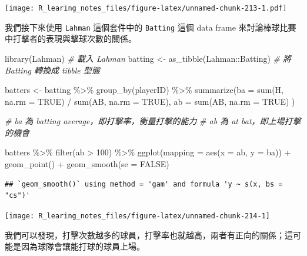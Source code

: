 \documentclass[
]{book}
\newenvironment{Shaded}{\begin{snugshade}}{\end{snugshade}}
\newcommand{\AttributeTok}[1]{\textcolor[rgb]{0.77,0.63,0.00}{#1}}
\newcommand{\CommentTok}[1]{\textcolor[rgb]{0.56,0.35,0.01}{\textit{#1}}}
\newcommand{\ConstantTok}[1]{\textcolor[rgb]{0.00,0.00,0.00}{#1}}
\newcommand{\DecValTok}[1]{\textcolor[rgb]{0.00,0.00,0.81}{#1}}
\newcommand{\FunctionTok}[1]{\textcolor[rgb]{0.00,0.00,0.00}{#1}}
\newcommand{\NormalTok}[1]{#1}
\newcommand{\OtherTok}[1]{\textcolor[rgb]{0.56,0.35,0.01}{#1}}
\newcommand{\SpecialCharTok}[1]{\textcolor[rgb]{0.00,0.00,0.00}{#1}}
\theoremstyle{definition}
\theoremstyle{remark}
\begin{document}
\texttt{[image: R\_learing\_notes\_files/figure-latex/unnamed-chunk-213-1.pdf]}

我們接下來使用 \texttt{Lahman} 這個套件中的 \texttt{Batting} 這個 data frame 來討論棒球比賽中打擊者的表現與擊球次數的關係。

\begin{Shaded}
\begin{Highlighting}[]
\FunctionTok{library}\NormalTok{(Lahman)  }\CommentTok{\# 載入 Lahman}
\NormalTok{batting }\OtherTok{\textless{}{-}} \FunctionTok{as\_tibble}\NormalTok{(Lahman}\SpecialCharTok{::}\NormalTok{Batting)  }\CommentTok{\# 將 Batting 轉換成 tibble 型態}

\NormalTok{batters }\OtherTok{\textless{}{-}}\NormalTok{ batting }\SpecialCharTok{\%\textgreater{}\%}
  \FunctionTok{group\_by}\NormalTok{(playerID) }\SpecialCharTok{\%\textgreater{}\%}
  \FunctionTok{summarize}\NormalTok{(}\AttributeTok{ba =} \FunctionTok{sum}\NormalTok{(H, }\AttributeTok{na.rm =} \ConstantTok{TRUE}\NormalTok{) }\SpecialCharTok{/} \FunctionTok{sum}\NormalTok{(AB, }\AttributeTok{na.rm =} \ConstantTok{TRUE}\NormalTok{),}
            \AttributeTok{ab =} \FunctionTok{sum}\NormalTok{(AB, }\AttributeTok{na.rm =} \ConstantTok{TRUE}\NormalTok{) )}

\CommentTok{\# ba 為 batting average，即打擊率，衡量打擊的能力}
\CommentTok{\# ab 為 at bat，即上場打擊的機會}

\NormalTok{batters }\SpecialCharTok{\%\textgreater{}\%}
  \FunctionTok{filter}\NormalTok{(ab }\SpecialCharTok{\textgreater{}} \DecValTok{100}\NormalTok{) }\SpecialCharTok{\%\textgreater{}\%}
  \FunctionTok{ggplot}\NormalTok{(}\AttributeTok{mapping =} \FunctionTok{aes}\NormalTok{(}\AttributeTok{x =}\NormalTok{ ab, }\AttributeTok{y =}\NormalTok{ ba)) }\SpecialCharTok{+} \FunctionTok{geom\_point}\NormalTok{() }\SpecialCharTok{+}
    \FunctionTok{geom\_smooth}\NormalTok{(}\AttributeTok{se =} \ConstantTok{FALSE}\NormalTok{)}
\end{Highlighting}
\end{Shaded}

\begin{verbatim}
## `geom_smooth()` using method = 'gam' and formula 'y ~ s(x, bs = "cs")'
\end{verbatim}

\begin{center}\texttt{[image: R\_learing\_notes\_files/figure-latex/unnamed-chunk-214-1]} \end{center}

我們可以發現，打擊次數越多的球員，打擊率也就越高，兩者有正向的關係；這可能是因為球隊會讓能打球的球員上場。
\end{document}
